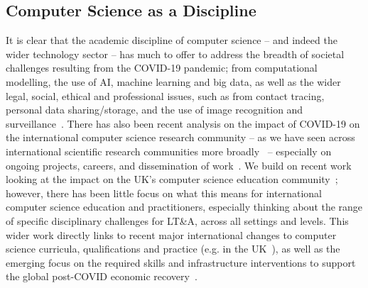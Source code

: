 \documentclass[conference]{IEEEtran}
\begin{document}

\subsection{Computer Science as a Discipline}


It is clear that the academic discipline of computer science -- and
indeed the wider technology sector -- has much to offer to address the
breadth of societal challenges resulting from the COVID-19 pandemic;
from computational modelling, the use of AI, machine learning and big
data, as well as the wider legal, social, ethical and professional
issues, such as from contact tracing, personal data sharing/storage,
and the use of image recognition and
surveillance~\cite{dwivedi-et-al:ijim2019,ting-et-al:2020,cerf:2020,chun-et-al:2020,rcjbbcnews:2020}. There
has also been recent analysis on the impact of COVID-19 on the
international computer science research community -- as we have seen
across international scientific research communities more
broadly~\cite{oecdcovid19:2020} -- especially on ongoing projects,
careers, and dissemination of work~\cite{msrcovid19:2020}. We build on
recent work looking at the impact on the UK's computer science
education community~\cite{crick-et-al:ukicer2020}; however, there has
been little focus on what this means for international computer
science education and practitioners, especially thinking about the
range of specific disciplinary challenges for LT\&A, across all
settings and levels. This wider work directly links to recent major
international changes to computer science curricula, qualifications
and practice (e.g. in the
UK~\cite{brown-et-al-sigcse2013,brown-et-al-toce2014}), as well as the
emerging focus on the required skills and infrastructure interventions
to support the global post-COVID economic
recovery~\cite{davenport-et-al:educon2020,euparl:2020,mckinsey:2020}.


\end{document}
